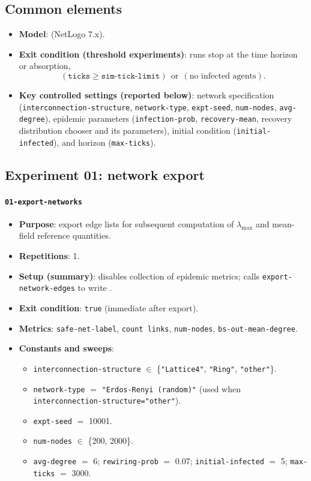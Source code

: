 \documentclass[11pt,a4paper]{article}
\begin{document}
\subsection{Common elements}
\begin{itemize}[leftmargin=*]
  \item \textbf{Model}:  (NetLogo 7.x).
  \item \textbf{Exit condition (threshold experiments)}: runs stop at the time horizon or absorption,
  \[
    (\texttt{ticks} \ge \texttt{sim-tick-limit}) \ \ \text{or}\ \ (\text{no infected agents}).
  \]
  \item \textbf{Key controlled settings (reported below)}: network specification (\texttt{interconnection-structure}, \texttt{network-type}, \texttt{expt-seed}, \texttt{num-nodes}, \texttt{avg-degree}), epidemic parameters (\texttt{infection-prob}, \texttt{recovery-mean}, recovery distribution chooser and its parameters), initial condition (\texttt{initial-infected}), and horizon (\texttt{max-ticks}).
\end{itemize}

\subsection{Experiment 01: network export}
\paragraph{\texttt{01-export-networks}}
\begin{itemize}[leftmargin=*]
  \item \textbf{Purpose}: export edge lists for subsequent computation of $\lambda_{\max}$ and mean-field reference quantities.
  \item \textbf{Repetitions}: 1.
  \item \textbf{Setup (summary)}: disables collection of epidemic metrics; calls \texttt{export-network-edges} to write .
  \item \textbf{Exit condition}: \texttt{true} (immediate after export).
  \item \textbf{Metrics}: \texttt{safe-net-label}, \texttt{count links}, \texttt{num-nodes}, \texttt{bs-out-mean-degree}.
  \item \textbf{Constants and sweeps}:
  \begin{itemize}[leftmargin=*]
    \item \texttt{interconnection-structure} $\in$ \{\texttt{"Lattice4"}, \texttt{"Ring"}, \texttt{"other"}\}.
    \item \texttt{network-type} $=$ \texttt{"Erdos-Renyi (random)"} (used when \texttt{interconnection-structure="other"}).
    \item \texttt{expt-seed} $=$ 10001.
    \item \texttt{num-nodes} $\in$ \{200, 2000\}.
    \item \texttt{avg-degree} $=$ 6; \texttt{rewiring-prob} $=$ 0.07; \texttt{initial-infected} $=$ 5; \texttt{max-ticks} $=$ 3000.
  \end{itemize}
\end{itemize}
\end{document}
